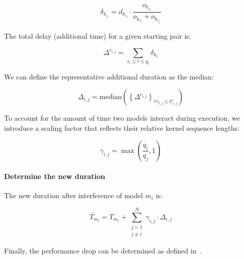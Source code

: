 $$
	\delta_{k_{s_i}} = d_{k_{s_i}} \cdot \frac{o_{k_{s_i}}}{o_{k_{s_i}} + o_{k_{s_j}}}
$$

The total delay (additional time) for a given starting pair is:

$$
	\Delta^{c_{i,j}} = \sum_{ s_i \leq t \leq q_i} \delta_{k_t}
$$

We can define the representative additional duration as the median:

$$
	\Delta_{i,j} = \text{median}\left(\left\{ \Delta^{c_{i,j}} \right\}_{\forall c_{i,j} \in \mathcal{C}_{i,j}}\right)
$$

To account for the amount of time two models interact during execution, we introduce a scaling factor that reflects their relative kernel sequence lengths:

$$
	\gamma_{i,j} = \max\left(\frac{q_i}{q_j}, 1\right)
$$

\paragraph{Determine the new duration} The new duration after interference of model $m_i$ is:

$$
	\tilde{T_{m_i}} = T_{m_i} + \sum_{\substack{j=1 \\ j \neq i}}^{N} \gamma_{i,j} \cdot \Delta_{i,j}
$$

Finally, the performance drop can be determined as defined in~.


